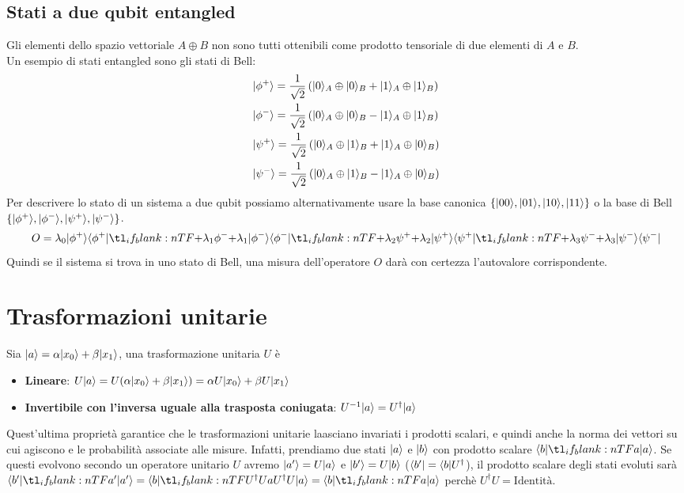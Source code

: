 \documentclass[12pt, a4paper]{report}
\begin{document}
\subsection{Stati a due qubit entangled}
Gli elementi dello spazio vettoriale $A\oplus B$ non sono tutti ottenibili come prodotto tensoriale di due elementi di $A$ e $B$. \\
Un esempio di stati entangled sono gli stati di Bell:
\begin{equation*}
    \begin{split}
        &| \phi^{+} \rangle = \frac{1}{\sqrt{2}}\left(| 0 \rangle_{A}\oplus| 0 \rangle_{B}+| 1 \rangle_{A}\oplus| 1 \rangle_{B}\right) \\
        &| \phi^{-} \rangle = \frac{1}{\sqrt{2}}\left(| 0 \rangle_{A}\oplus| 0 \rangle_{B}-| 1 \rangle_{A}\oplus| 1 \rangle_{B}\right) \\
        &| \psi^{+} \rangle = \frac{1}{\sqrt{2}}\left(| 0 \rangle_{A}\oplus| 1 \rangle_{B}+| 1 \rangle_{A}\oplus| 0 \rangle_{B}\right) \\
        &| \psi^{-} \rangle = \frac{1}{\sqrt{2}}\left(| 0 \rangle_{A}\oplus| 1 \rangle_{B}-| 1 \rangle_{A}\oplus| 0 \rangle_{B}\right) \\
    \end{split}
\end{equation*}
Per descrivere lo stato di un sistema a due qubit possiamo alternativamente usare la base canonica $\left\{| 00 \rangle,| 01 \rangle,| 10 \rangle,| 11 \rangle\right\}$ o la base di Bell $\left\{| \phi^{+} \rangle,| \phi^{-} \rangle,| \psi^{+} \rangle,| \psi^{-} \rangle\right\}$.
\begin{equation*}
    O = \lambda_{0}\ket{\phi^{+}}\braket{\phi^{+}}[+\lambda_{1}]{\phi^{-}}\braket{\phi^{-}}[+\lambda_{2}]{\psi^{+}}\braket{\psi^{+}}[+\lambda_{3}]{\psi^{-}}\bra{\psi^{-}}
\end{equation*}
Quindi se il sistema si trova in uno stato di Bell, una misura dell'operatore $O$ darà con certezza l'autovalore corrispondente.
\section{Trasformazioni unitarie}
Sia $| a \rangle = \alpha| x_{0} \rangle+\beta| x_{1} \rangle$, una trasformazione  unitaria $U$ è
\begin{itemize}
    \item \textbf{Lineare}: $U| a \rangle=U(\alpha| x_{0} \rangle+\beta| x_{1} \rangle) = \alpha U| x_{0} \rangle+\beta U| x_{1} \rangle$
    \item \textbf{Invertibile  con l'inversa uguale alla trasposta coniugata}: $U^{-1}| a \rangle=U^{\dagger}| a \rangle$
\end{itemize}
Quest'ultima proprietà garantice che le trasformazioni unitarie laasciano invariati i prodotti scalari, e quindi anche la norma dei vettori su cui agiscono e le probabilità associate alle misure. Infatti, prendiamo due stati $| a \rangle$ e $| b \rangle$ con prodotto scalare $\braket{b}{a}$. Se questi evolvono secondo un operatore unitario $U$ avremo $| a' \rangle=U| a \rangle$ e $| b' \rangle=U| b \rangle$ ($\langle b' |=\langle b |U^{\dagger}$), il prodotto scalare degli stati evoluti sarà $\braket{b'}{a'}=\braket{b}[U^{\dagger}U]{a}=\braket{b}{a}$ perchè $U^{\dagger}U=\text{Identità}$.
\end{document}

